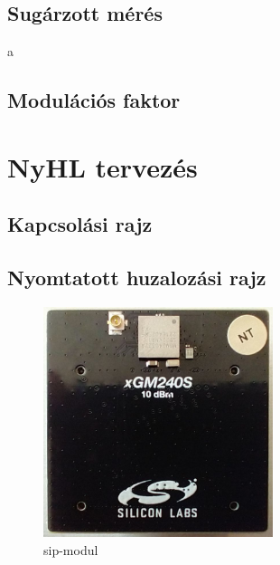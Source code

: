 \documentclass[a4paper,12pt,titlepage]{article}
\begin{document}
        \subsection{Sugárzott mérés}
            a
        \subsection{Modulációs faktor}
    \section{NyHL tervezés}
        \subsection{Kapcsolási rajz}
        \subsection{Nyomtatott huzalozási rajz}
\begin{figure}
                \centering
                \includegraphics[width=0.6\textwidth]{kep/szerkesztett/sip-modul.jpg}
                \caption{sip-modul}
                \label{fig:sip}
            \end{figure}
%
%
\end{document}
